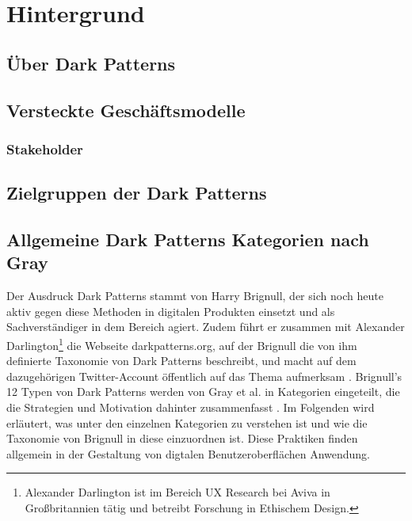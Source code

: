 \documentclass[a4paper]{article}
\begin{document}
\section{Hintergrund}
\label{sec:hintergrund}


\subsection{Über Dark Patterns} 
\label{sub:die_hintergruende_der_dark_patterns}


\subsection{Versteckte Geschäftsmodelle} 
\label{sub:versteckte_geschaeftsmodelle}


\subsubsection{Stakeholder}
\label{sub:stakeholder}


\subsection{Zielgruppen der Dark Patterns} 
\label{sub:zielgruppen_der_dark_patterns}


\subsection{Allgemeine Dark Patterns Kategorien nach Gray}
\label{sub:dark_patterns_kategorien}
Der Ausdruck Dark Patterns stammt von Harry Brignull, der sich noch heute aktiv gegen diese Methoden in digitalen Produkten einsetzt und als Sachverständiger in dem Bereich agiert. Zudem führt er zusammen mit Alexander Darlington\footnote{\label{foot:2} Alexander Darlington ist im Bereich UX Research bei Aviva in Großbritannien tätig und betreibt Forschung in Ethischem Design.} die Webseite darkpatterns.org, auf der Brignull die von ihm definierte Taxonomie von Dark Patterns beschreibt, und macht auf dem dazugehörigen Twitter-Account öffentlich auf das Thema aufmerksam \cite{brignull3}\cite{brignull4}. Brignull's 12 Typen von Dark Patterns werden von Gray et al. in Kategorien eingeteilt, die die Strategien und Motivation dahinter zusammenfasst \cite{gray}. 
Im Folgenden wird erläutert, was unter den einzelnen Kategorien zu verstehen ist und wie die Taxonomie von Brignull in diese einzuordnen ist. Diese Praktiken finden allgemein in der Gestaltung von digtalen Benutzeroberflächen Anwendung.
\end{document}
